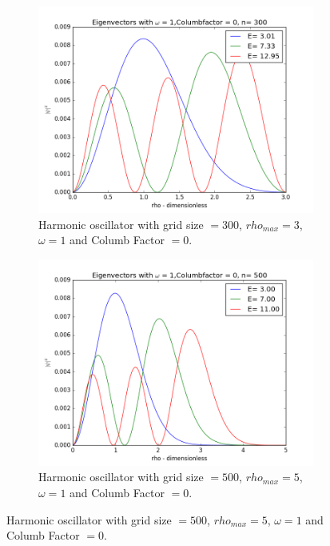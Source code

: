 \documentclass[a4paper,11pt]{article}
\begin{document}
{\begin{figure}
	\centering
	\begin{subfigure}[b]{0.4\textwidth}
		\includegraphics[scale=0.4]{ok_test1_WR=1_CF=0_C=300_rhostop=3}
		\caption{Harmonic oscillator with grid size $=300$, $rho_{max}=3$, $\omega=1$ and Columb Factor $=0$. }
		\label{fig:test1}
	\end{subfigure}
	\begin{subfigure}[b]{0.4\textwidth}
		\includegraphics[scale=0.4]{ok_Project_2_Wr=1_Columb_factor=0_n=500_rho_stop=5}
		\caption{Harmonic oscillator with grid size $=500$, $rho_{max}=5$, $\omega=1$ and Columb Factor $=0$. }
		\label{fig:goodtest1}
	\end{subfigure}
\end{figure}


}
\end{document}
